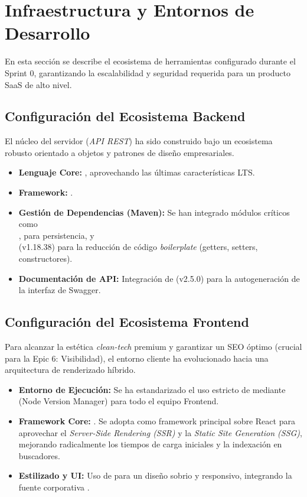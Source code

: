 \section{Infraestructura y Entornos de Desarrollo}
\label{sec:infraestructura_entornos}
En esta sección se describe el ecosistema de herramientas configurado durante el Sprint 0, garantizando la escalabilidad y seguridad requerida para un producto SaaS de alto nivel.

\subsection{Configuración del Ecosistema Backend}
El núcleo del servidor (\textit{API REST}) ha sido construido bajo un ecosistema robusto orientado a objetos y patrones de diseño empresariales.

\begin{itemize}[noitemsep]
    \item \textbf{Lenguaje Core:} , aprovechando las últimas características LTS.
    \item \textbf{Framework:} .
    \item \textbf{Gestión de Dependencias (Maven):} Se han integrado módulos críticos como  \\
    ,  para persistencia, y  \\
    (v1.18.38) para la reducción de código \textit{boilerplate} (getters, setters, constructores).
    \item \textbf{Documentación de API:} Integración de  (v2.5.0) para la autogeneración de la interfaz de Swagger.
\end{itemize}

\subsection{Configuración del Ecosistema Frontend}
Para alcanzar la estética \textit{clean-tech} premium y garantizar un SEO óptimo (crucial para la Epic 6: Visibilidad), el entorno cliente ha evolucionado hacia una arquitectura de renderizado híbrido.

\begin{itemize}[noitemsep]
    \item \textbf{Entorno de Ejecución:} Se ha estandarizado el uso estricto de  mediante  (Node Version Manager) para todo el equipo Frontend.
    \item \textbf{Framework Core:} . Se adopta como framework principal sobre React para aprovechar el \textit{Server-Side Rendering (SSR)} y la \textit{Static Site Generation (SSG)}, mejorando radicalmente los tiempos de carga iniciales y la indexación en buscadores.
    \item \textbf{Estilizado y UI:} Uso de  para un diseño sobrio y responsivo, integrando la fuente corporativa .
\end{itemize}

